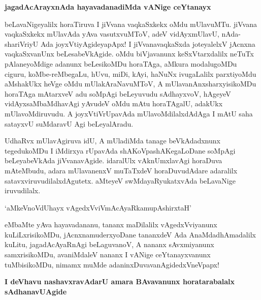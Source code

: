 {\bigskip
\noindent
{\large\bf jagadAcArayxnAda hayavadanadiMda vANige ceYtanayx}}\label{page128}
\medskip

\noindent
beLavaNigeyalilx horaTiruva I jiVvana vaqkaSxkekx oMdu mUlavuMTu. jiVvana vaqkaSxkekx mUla\-vAda yAva vasutxvuMToV, adeV vidAyxmUlavU, nAda-shariV\break\-riyU Ada joyxVtiyAgideyapApx! I jiVva\-navaqkaSxda joteyalelxV jAcnxna vaqkaSx\-vanUnx beLesabeVkAgide. oMdu biVjavanunx keSxVtarxdalilx neTuTx pAlaneyoM\-dige \hbox{adanunx} beLesikoMDu horaTAga, aMkura modalugoMDu ciguru, koMbe-reMbegaLu, hUvu, miDi, kAyi, haNuNx ivugaLalilx parxtiyoMdu aMshakUkx heVge oMdu mUlakAraNavuMToV, A mUlava\-nAnx\-sharxyisikoMDu horaTAga mAtarxveV adu soMpAgi beLeyuvudu sAdhayxvoV, hAgeyeV vidAyx\-saMbaMdhavAgi yAvudeV oMdu mAtu horaTAgalU, adakUkx mUlavoMdiruvudu. A joyxVtiV\-rUpa\-vAda mUlavoMdilalxdAdAga I mAtU saha satayxvU suMdaravU Agi beLeyalAradu.

\medskip
UdhaRvx mUlavAgiruva idU, A mUladiMda tanage beVkAdadxnunx tegedu\-koMDu I iMdirxya rUpavAda shAKoVpashAKegaLoDane soMpAgi beLeya\-beVkAda jiVvanavAgide. idaralUlx vAknUmxla\-vAgi horaDuva mAteMbudu, adara mUlavanenxV muTaTxdeV horaDuvudAdare adaralilx satavxviruvu\-dilalx\-dAgutetx. aMteyeV swMdayaRyukatxvAda beLavaNige iruvudilalx.

\begin{shloka}
`aMkeVnoVdUhayx vAgedxVviVmAcAyaRkamupAshirxtaH'
\end{shloka}

eMbaMte yAva hayavadananu, tananx maDilalilx vAgedxVviyanunx kuLiLxrisi\-koMDu, jAcnxna\-muderxyo\-Dane tananxdeV Ada AnaMdadhAmadalilx kuLitu, jagadAcAyaRnAgi beLaguvanoV, A nananx sAvxmi\-yanunx samxrisi\-koMDu, avaniMdaleV nananx I vANige ceYtanayxvanunx tuMbisikoMDu, nimamx muMde adaninxDuvava\-nAgidedxVneVpapx!

\newpage
{\bigskip
\noindent
{\large\bf I deVhavu nashavxravAdarU amara BAvavanunx horatarabalalx sAdhanavU\break Agide}}\label{page129}
\medskip


